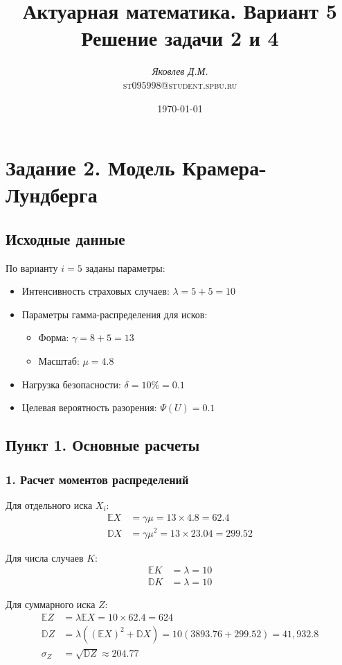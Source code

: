 \documentclass[12pt]{article}
\title{Актуарная математика. Вариант 5\\
	Решение задачи 2 и 4}
\author{\emph{Яковлев Д.М.}\\\textsc{st095998@student.spbu.ru}}
\date{\today}
\begin{document}
	\maketitle
	\section*{Задание 2. Модель Крамера-Лундберга}
	
	\subsection*{Исходные данные}
	По варианту $i = 5$ заданы параметры:
	\begin{itemize}
		\item Интенсивность страховых случаев: $\lambda = 5 + 5 = 10$
		\item Параметры гамма-распределения для исков:
		\begin{itemize}
			\item Форма: $\gamma = 8 + 5 = 13$
			\item Масштаб: $\mu = 4.8$
		\end{itemize}
		\item Нагрузка безопасности: $\delta = 10\% = 0.1$
		\item Целевая вероятность разорения: $\Psi(U) = 0.1$
	\end{itemize}
	
	\subsection*{Пункт 1. Основные расчеты}
	
	\subsubsection*{1. Расчет моментов распределений}
	
	Для отдельного иска $X_i$:
	\begin{align*}
		\mathbb{E}X &= \gamma \mu = 13 \times 4.8 = 62.4 \\
		\mathbb{D}X &= \gamma \mu^2 = 13 \times 23.04 = 299.52
	\end{align*}
	
	Для числа случаев $K$:
	\begin{align*}
		\mathbb{E}K &= \lambda = 10 \\
		\mathbb{D}K &= \lambda = 10
	\end{align*}
	
	Для суммарного иска $Z$:
	\begin{align*}
		\mathbb{E}Z &= \lambda \mathbb{E}X = 10 \times 62.4 = 624 \\
		\mathbb{D}Z &= \lambda((\mathbb{E}X)^2 + \mathbb{D}X) = 10(3893.76 + 299.52) = 41,\!932.8 \\
		\sigma_Z &= \sqrt{\mathbb{D}Z} \approx 204.77
	\end{align*}
	
\end{document}
